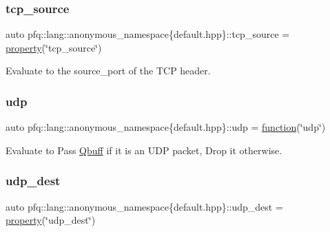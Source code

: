 \subsubsection{\texorpdfstring{tcp\+\_\+source}{tcp\_source}}
{\footnotesize\ttfamily auto pfq\+::lang\+::anonymous\+\_\+namespace\{default.\+hpp\}\+::tcp\+\_\+source = \hyperlink{namespacepfq_1_1lang_a1249450e72229273b0db707a286aea91}{property}(\char`\"{}tcp\+\_\+source\char`\"{})}



Evaluate to the {\ttfamily source\+\_\+port} of the T\+CP header. 

\mbox{\label{namespacepfq_1_1lang_1_1anonymous__namespace_02default_8hpp_03_a0b8b927aad3be7034521ebde0dabf7d3}} 
\subsubsection{\texorpdfstring{udp}{udp}}
{\footnotesize\ttfamily auto pfq\+::lang\+::anonymous\+\_\+namespace\{default.\+hpp\}\+::udp = \hyperlink{namespacepfq_1_1lang_a1a4638059d700ae08d0ca63886ff2bb3}{function}(\char`\"{}udp\char`\"{})}



Evaluate to {\ttfamily Pass} \hyperlink{structpfq_1_1lang_1_1Qbuff}{Qbuff} if it is an U\+DP packet, {\ttfamily Drop} it otherwise. 

\mbox{\label{namespacepfq_1_1lang_1_1anonymous__namespace_02default_8hpp_03_a7c15d9ec0af24b9515acc8a04b7b1e2e}} 
\subsubsection{\texorpdfstring{udp\+\_\+dest}{udp\_dest}}
{\footnotesize\ttfamily auto pfq\+::lang\+::anonymous\+\_\+namespace\{default.\+hpp\}\+::udp\+\_\+dest = \hyperlink{namespacepfq_1_1lang_a1249450e72229273b0db707a286aea91}{property}(\char`\"{}udp\+\_\+dest\char`\"{})}



